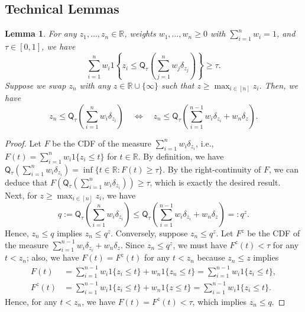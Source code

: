 \documentclass[11pt,letterpaper]{article}
\newtheorem{lemma}{Lemma} %
\theoremstyle{definition}
\newcommand{\R}{\mathbb{R}}
\begin{document}
\subsection{Technical Lemmas}

\begin{lemma}
    \label{lem:weighted_quantile_rank}
    For any $z_1, \ldots, z_n \in \R$, weights $w_1, \ldots, w_n \ge 0$ with $\sum_{i = 1}^{n} w_i = 1$, and $\tau \in [0, 1]$, we have
    \begin{equation*}
        \sum_{i = 1}^{n} w_i 1\left\{z_i \le \mathsf{Q}_\tau\left(\sum_{j = 1}^{n} w_j \delta_{z_j}\right)\right\} \ge \tau.
    \end{equation*}
    Suppose we swap $z_n$ with any $z \in \R \cup \{\infty\}$ such that $z \ge \max_{i \in [n]} z_i$. Then, we have
    \begin{equation*}
        z_n \le \mathsf{Q}_\tau\left(\sum_{i = 1}^{n} w_i \delta_{z_i}\right) \quad \Leftrightarrow \quad z_n \le \mathsf{Q}_\tau\left(\sum_{i = 1}^{n - 1} w_i \delta_{z_i} + w_n \delta_z\right). 
    \end{equation*}
\end{lemma}
\begin{proof}
    Let $F$ be the CDF of the measure $\sum_{i = 1}^{n} w_i \delta_{z_i}$, i.e., $F(t) = \sum_{i = 1}^{n} w_i 1\{z_i \le t\}$ for $t \in \R$. By definition, we have $\mathsf{Q}_\tau\left(\sum_{i = 1}^{n} w_i \delta_{z_i}\right) = \inf\{t \in \R : F(t) \ge \tau\}$. By the right-continuity of $F$, we can deduce that $F\left(\mathsf{Q}_\tau\left(\sum_{i = 1}^{n} w_i \delta_{z_i}\right)\right) \ge \tau$, which is exactly the desired result. Next, for $z \ge \max_{i \in [n]} z_i$, we have 
    \begin{equation*}
        q := \mathsf{Q}_\tau\left(\sum_{i = 1}^{n} w_i \delta_{z_i}\right) \le \mathsf{Q}_\tau\left(\sum_{i = 1}^{n - 1} w_i \delta_{z_i} + w_n \delta_z\right) =: q^z.
    \end{equation*}
    Hence, $z_n \le q$ implies $z_n \le q^z$. Conversely, suppose $z_n \le q^z$. Let $F^z$ be the CDF of the measure $\sum_{i = 1}^{n - 1} w_i \delta_{z_i} + w_n \delta_z$. Since $z_n \le q^z$, we must have $F^z(t) < \tau$ for any $t < z_n$; also, we have $F(t) = F^z(t)$ for any $t < z_n$ because $z_n \le z$ implies
    \begin{align*}
        F(t) & = \sum_{i = 1}^{n - 1} w_i 1\{z_i \le t\} + w_n 1\{z_n \le t\} = \sum_{i = 1}^{n - 1} w_i 1\{z_i \le t\}, \\
        F^z(t) & = \sum_{i = 1}^{n - 1} w_i 1\{z_i \le t\} + w_n 1\{z \le t\} = \sum_{i = 1}^{n - 1} w_i 1\{z_i \le t\}.
    \end{align*}
    Hence, for any $t < z_n$, we have $F(t) = F^z(t) < \tau$, which implies $z_n \le q$.
\end{proof}
\end{document}
